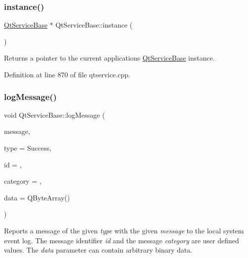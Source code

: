 \mbox{\label{class_qt_service_base_a8f030376e32cc47736bfc1a1e1ecf855}} 
\subsubsection{\texorpdfstring{instance()}{instance()}}
{\footnotesize\ttfamily \mbox{\hyperlink{class_qt_service_base}{Qt\+Service\+Base}} $\ast$ Qt\+Service\+Base\+::instance (\begin{DoxyParamCaption}{ }\end{DoxyParamCaption})\hspace{0.3cm}{\ttfamily [static]}}

Returns a pointer to the current application\textquotesingle{}s \mbox{\hyperlink{class_qt_service_base}{Qt\+Service\+Base}} instance. 

Definition at line 870 of file qtservice.\+cpp.

\mbox{\label{class_qt_service_base_ac071ce0b30547e17c3b3ca9dcb0108c9}} 
\subsubsection{\texorpdfstring{log\+Message()}{logMessage()}}
{\footnotesize\ttfamily void Qt\+Service\+Base\+::log\+Message (\begin{DoxyParamCaption}\item[{const Q\+String \&}]{message,  }\item[{\mbox{\hyperlink{class_qt_service_base_acffd9389fe7178bf1f35d8bf3dae1095}{Qt\+Service\+Base\+::\+Message\+Type}}}]{type = {\ttfamily Success},  }\item[{int}]{id = {},  }\item[{uint}]{category = {},  }\item[{const Q\+Byte\+Array \&}]{data = {\ttfamily QByteArray()} }\end{DoxyParamCaption})}

Reports a message of the given {\itshape type} with the given {\itshape message} to the local system event log. The message identifier {\itshape id} and the message {\itshape category} are user defined values. The {\itshape data} parameter can contain arbitrary binary data.

